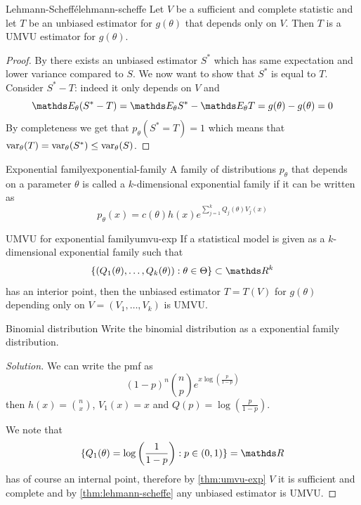 \documentclass[12pt]{extarticle}
\begin{document}
\begin{theorem}{Lehmann-Scheffé}{lehmann-scheffe}
	Let $V$ be a sufficient and complete statistic and let $T$ be an unbiased estimator for $g(\theta)$ that depends only on $V$.
	Then $T$ is a UMVU estimator for $g(\theta)$.
\end{theorem}
\begin{proof}
	By  there exists an unbiased estimator $S^*$ which has same expectation and lower variance compared to $S$.
	We now want to show that $S^*$ is equal to $T$.
	Consider $S^* - T$: indeed it only depends on $V$ and
	\begin{equation}
		\E_\theta(S^* - T) = \E_\theta S^* -\E_\theta T = g(\theta) - g(\theta) = 0
	\end{equation}
	By completeness we get that $p_\theta(S^* = T) = 1$ which means that $\var_\theta(T) = \var_\theta(S^*) \leq \var_\theta(S)$.
\end{proof}

\begin{definition}{Exponential family}{exponential-family}
	A family of distributions $p_\theta$ that depends on a parameter $\theta$
	is called a $k$-dimensional exponential family if it can be written as
	\begin{equation}
		p_\theta(x) = c(\theta) h(x)e^{\sum^k_{j=1} Q_j(\theta) V_j(x)}
	\end{equation}
\end{definition}

\begin{theorem}{UMVU for exponential family}{umvu-exp}
	If a statistical model is given as a $k$-dimensional exponential family such that
	\begin{equation}
		\{(Q_1(\theta), \dots, Q_k(\theta)) : \theta \in \Theta \} \subset \R^k
	\end{equation}
	has an interior point, then the unbiased estimator $T = T(V)$ for $g(\theta)$
	depending only on $V = (V_1, \dots, V_k)$ is UMVU.
\end{theorem}

\begin{example}{Binomial distribution}{}
	Write the binomial distribution as a exponential family distribution.
\end{example}
\begin{proof}[Solution]
	We can write the pmf as
	\begin{equation}
		(1-p)^n \binom{n}{p}e^{x \log\left(\frac{p}{1-p}\right)}
	\end{equation}
	then $h(x) = \binom{n}{x}$, $V_1(x) = x$ and $Q(p) = \log\left(\frac{p}{1-p}\right)$.

	We note that
	\begin{equation}
		\{Q_1(\theta) = \log \left( \frac{1}{1-p} \right) : p\in(0, 1)\} = \R
	\end{equation}
	has of course an internal point, therefore by \cref{thm:umvu-exp} $V$ it is sufficient and complete
	and by \cref{thm:lehmann-scheffe} any unbiased estimator is UMVU.
\end{proof}
\end{document}
